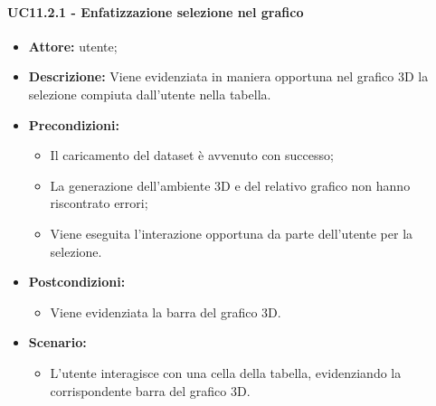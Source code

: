 \paragraph{UC11.2.1 - Enfatizzazione selezione nel grafico}
\begin{itemize}    
    \item \textbf{Attore:} utente;
    \item \textbf{Descrizione:} Viene evidenziata in maniera opportuna nel grafico 3D la selezione compiuta dall'utente nella tabella.
    \item \textbf{Precondizioni:}    
        \begin{itemize}
            \item Il caricamento del dataset è avvenuto con successo;
            \item La generazione dell'ambiente 3D e del relativo grafico non hanno riscontrato errori;
            \item Viene eseguita l'interazione opportuna da parte dell'utente per la selezione.
        \end{itemize}    
    \item \textbf{Postcondizioni:}
        \begin{itemize}
            \item Viene evidenziata la barra del grafico 3D.
        \end{itemize}    
    \item \textbf{Scenario:} 
        \begin{itemize}
            \item L'utente interagisce con una cella della tabella, evidenziando la corrispondente barra del grafico 3D.
        \end{itemize}
\end{itemize}
